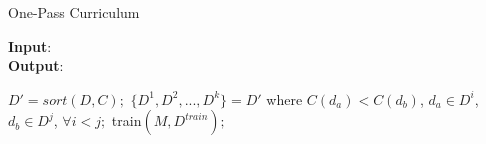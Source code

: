 \begin{algorithm}
    \caption{One-Pass Curriculum \cite{cirik2016visualizing}}\label{alg:onepass}
    \hspace*{\algorithmicindent} \textbf{Input}: \\
    \hspace*{\algorithmicindent} \textbf{Output}: 
    \begin{algorithmic}[1]
    \State $D'= sort(D,C);$
    \State $\lbrace D^1, D^2,...,D^k \rbrace = D'$ where $C(d_a) < C(d_b)$, $d_a\in D^i$, $d_b\in D^j$, $\forall i<j;$
        \State train$(M, D^{train});$
        \EndWhile
    \EndFor
    \end{algorithmic}
\end{algorithm}

